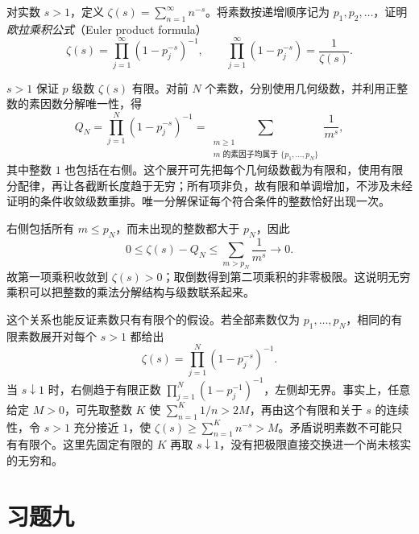 \begin{example}
\label{ex:euler-product-zeta}
对实数 $s>1$，定义 $\zeta(s)=\sum_{n=1}^{\infty}n^{-s}$。将素数按递增顺序记为 $p_1,p_2,\ldots$，证明\emph{欧拉乘积公式}（Euler product formula）
\begin{equation}
    \zeta(s)=\prod_{j=1}^{\infty}(1-p_j^{-s})^{-1},
    \qquad
    \prod_{j=1}^{\infty}(1-p_j^{-s})=\frac1{\zeta(s)}.
    \label{eq:euler-product-zeta}
\end{equation}
\end{example}

\begin{solve}
$s>1$ 保证 $p$ 级数 $\zeta(s)$ 有限。对前 $N$ 个素数，分别使用几何级数，并利用正整数的素因数分解唯一性，得
\[
    Q_N=\prod_{j=1}^N(1-p_j^{-s})^{-1}
       =\sum_{\substack{m\geq1\\m\text{ 的素因子均属于 }\{p_1,\ldots,p_N\}}}\frac1{m^s},
\]
其中整数 $1$ 也包括在右侧。这个展开可先把每个几何级数截为有限和，使用有限分配律，再让各截断长度趋于无穷；所有项非负，故有限和单调增加，不涉及未经证明的条件收敛级数重排。唯一分解保证每个符合条件的整数恰好出现一次。

右侧包括所有 $m\leq p_N$，而未出现的整数都大于 $p_N$，因此
\[
    0\leq\zeta(s)-Q_N\leq\sum_{m>p_N}\frac1{m^s}\longrightarrow0.
\]
故第一项乘积收敛到 $\zeta(s)>0$；取倒数得到第二项乘积的非零极限。这说明无穷乘积可以把整数的乘法分解结构与级数联系起来。

这个关系也能反证素数只有有限个的假设。若全部素数仅为 $p_1,\ldots,p_N$，相同的有限素数展开对每个 $s>1$ 都给出
\[
    \zeta(s)=\prod_{j=1}^N(1-p_j^{-s})^{-1}.
\]
当 $s\downarrow1$ 时，右侧趋于有限正数 $\prod_{j=1}^N(1-p_j^{-1})^{-1}$，左侧却无界。事实上，任意给定 $M>0$，可先取整数 $K$ 使 $\sum_{n=1}^K1/n>2M$，再由这个有限和关于 $s$ 的连续性，令 $s>1$ 充分接近 $1$，使 $\zeta(s)\geq\sum_{n=1}^K n^{-s}>M$。矛盾说明素数不可能只有有限个。这里先固定有限的 $K$ 再取 $s\downarrow1$，没有把极限直接交换进一个尚未核实的无穷和。
\end{solve}

\section*{习题九}
